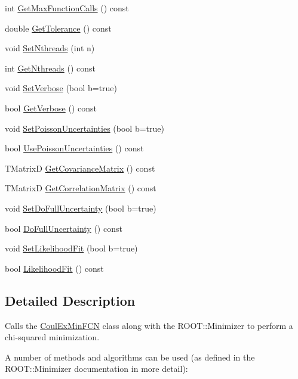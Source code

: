 \begin{DoxyCompactItemize}
\item 
int \hyperlink{classCoulExFitter_a96352023871d7431849e35c23a59ee48}{Get\-Max\-Function\-Calls} () const 
\item 
double \hyperlink{classCoulExFitter_a6b78c02a350d2cdcaa42e105aab4cf88}{Get\-Tolerance} () const 
\item 
void \hyperlink{classCoulExFitter_a5ed39b91e4a9db0b148e3854dcf05d07}{Set\-Nthreads} (int n)
\item 
int \hyperlink{classCoulExFitter_a9e65723ca1492e71bd7f1ff9b457c1fb}{Get\-Nthreads} () const 
\item 
void \hyperlink{classCoulExFitter_aadbcd260ffdc402f24c122a549f08743}{Set\-Verbose} (bool b=true)
\item 
bool \hyperlink{classCoulExFitter_ad7f2ed3a90a161d3d7f8eb6571649da6}{Get\-Verbose} () const 
\item 
void \hyperlink{classCoulExFitter_a9e577fdf18978a59a8a3059522ba7355}{Set\-Poisson\-Uncertainties} (bool b=true)
\item 
bool \hyperlink{classCoulExFitter_af2820d3ab13fcc8df1eaee486d58fb09}{Use\-Poisson\-Uncertainties} () const 
\item 
T\-Matrix\-D \hyperlink{classCoulExFitter_a6d59f4e8c05a18c285972ea722e7a503}{Get\-Covariance\-Matrix} () const 
\item 
T\-Matrix\-D \hyperlink{classCoulExFitter_aeda72e2dee8b0aa45157cb4562f9aab3}{Get\-Correlation\-Matrix} () const 
\item 
void \hyperlink{classCoulExFitter_aacc37bb66234dbd3f235683cad8e1427}{Set\-Do\-Full\-Uncertainty} (bool b=true)
\item 
bool \hyperlink{classCoulExFitter_a4fd09244f82e3af46add6960543524d9}{Do\-Full\-Uncertainty} () const 
\item 
void \hyperlink{classCoulExFitter_a7fa4c365be49eb9f6cf47684ff6b15bc}{Set\-Likelihood\-Fit} (bool b=true)
\item 
bool \hyperlink{classCoulExFitter_a96b4e6bd340c279bc913e875d11eca7c}{Likelihood\-Fit} () const 
\end{DoxyCompactItemize}


\subsection{Detailed Description}
Calls the \hyperlink{classCoulExMinFCN}{Coul\-Ex\-Min\-F\-C\-N} class along with the R\-O\-O\-T\-::\-Minimizer to perform a chi-\/squared minimization. 

A number of methods and algorithms can be used (as defined in the R\-O\-O\-T\-::\-Minimizer documentation in more detail)\-:

